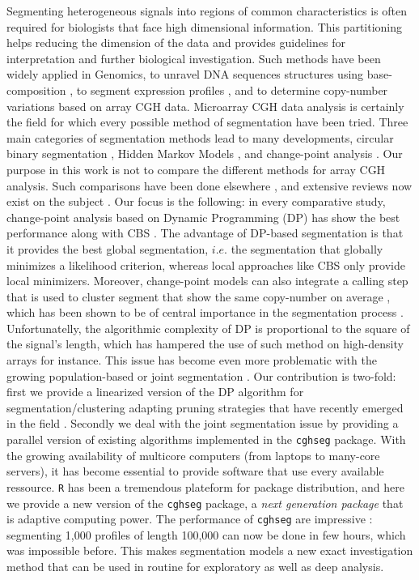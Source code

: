 \documentclass[11pt]{llncs}
\begin{document}
Segmenting heterogeneous signals into regions of common characteristics is often required for biologists that face high dimensional information. This partitioning helps reducing the dimension of the data and provides guidelines for interpretation and further biological investigation. Such methods have been widely applied in Genomics, to unravel DNA sequences structures using base-composition \cite{NBM02}, to segment expression profiles \cite{DHG06,NLR09}, and to determine copy-number variations based on array CGH data. Microarray CGH data analysis is certainly the field for which every possible method of segmentation have been tried. Three main categories of segmentation methods lead to many developments, circular binary segmentation \cite{OVL04}, Hidden Markov Models \cite{MTT06}, and change-point analysis \cite{picard_statistical_2005,picard_2007}. Our purpose in this work is not to compare the different methods for array CGH analysis. Such comparisons have been done elsewhere \cite{WF05}, and extensive reviews now exist on the subject \cite{S08,WPW11}. Our focus is the following: in every comparative study, change-point analysis based on Dynamic Programming (DP) has show the best performance along with CBS \cite{WF05,bams}. The advantage of DP-based segmentation is that it provides the best global segmentation, $i.e.$ the segmentation that globally minimizes a likelihood criterion, whereas local approaches like CBS only provide local minimizers. Moreover, change-point models can also integrate a calling step that is used to cluster segment that show the same copy-number on average \cite{picard_2007,WKV07}, which has been shown to be of central importance in the segmentation process \cite{WF05}. Unfortunatelly, the algorithmic complexity of DP is proportional to the square of the signal's length, which has hampered the use of such method on high-density arrays for instance. This issue has become even more problematic with the growing population-based or joint segmentation \cite{PLH11, TPK11,ZSJ10}. Our contribution is two-fold: first we provide a linearized version of the DP algorithm for segmentation/clustering adapting pruning strategies that have recently emerged in the field \cite{killick_optimal_2011,rigaill_2010}. Secondly we deal with the joint segmentation issue by providing a parallel version of existing algorithms implemented in the \texttt{cghseg} package. With the growing availability of multicore computers (from laptops to many-core servers), it has become essential to provide software that use every available ressource. \texttt{R} has been a tremendous plateform for package distribution, and here we provide a new version of the \texttt{cghseg} package, a \textit{next generation package} that is adaptive computing power. The performance of \texttt{cghseg} are impressive : segmenting 1,000 profiles of length 100,000 can now be done in few hours, which was impossible before. This makes segmentation models a new exact investigation method that can be used in routine for exploratory as well as deep analysis.
\end{document}
